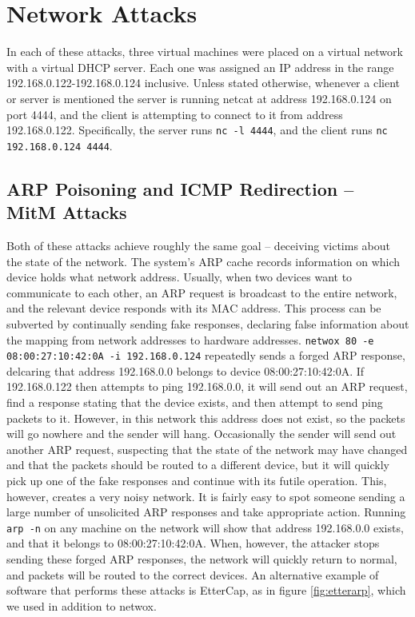 \section{Network Attacks}


In each of these attacks, three virtual machines were placed on a virtual network with a virtual DHCP server. Each one
was assigned an IP address in the range 192.168.0.122-192.168.0.124 inclusive. Unless stated otherwise, whenever a
client or server is mentioned the server is running netcat at address 192.168.0.124 on port 4444, and the client is
attempting to connect to it from address 192.168.0.122. Specifically, the server runs {\tt nc -l 4444}, and the client
runs {\tt nc 192.168.0.124 4444}.

\subsection{ARP Poisoning and ICMP Redirection -- MitM Attacks}

Both of these attacks achieve roughly the same goal -- deceiving victims about the state of the network. The system's
ARP cache records information on which device holds what network address. Usually, when two devices want to communicate
to each other, an ARP request is broadcast to the entire network, and the relevant device responds with its MAC address.
This process can be subverted by continually sending fake responses, declaring false information about the mapping from
network addresses to hardware addresses. {\tt netwox 80 -e 08:00:27:10:42:0A -i 192.168.0.124} repeatedly sends a forged
ARP response, delcaring that address 192.168.0.0 belongs to device 08:00:27:10:42:0A. If 192.168.0.122 then attempts to
ping 192.168.0.0, it will send out an ARP request, find a response stating that the device exists, and then attempt to
send ping packets to it. However, in this network this address does not exist, so the packets will go nowhere and the
sender will hang. Occasionally the sender will send out another ARP request, suspecting that the state of the network
may have changed and that the packets should be routed to a different device, but it will quickly pick up one of the
fake responses and continue with its futile operation. This, however, creates a very noisy network. It is fairly easy to
spot someone sending a large number of unsolicited ARP responses and take appropriate action. Running {\tt arp -n} on
any machine on the network will show that address 192.168.0.0 exists, and that it belongs to 08:00:27:10:42:0A. When,
however, the attacker stops sending these forged ARP responses, the network will quickly return to normal, and packets
will be routed to the correct devices. An alternative example of software that performs these attacks is
EtterCap, as in figure \ref{fig:etterarp}, which we used in addition to netwox.

